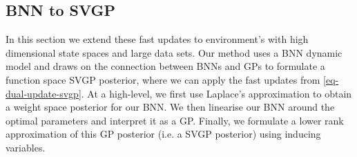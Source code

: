 \documentclass{article}
\newcommand{\state}{\ensuremath{\mathbf{s}}}
\newcommand{\action}{\ensuremath{\mathbf{a}}}
\newcommand{\inducingVariable}{\ensuremath{\mathbf{u}}}
\newcommand{\dualParam}[1]{\ensuremath{\bm{\lambda}_{#1}}}
\newcommand{\meanParam}[1]{\ensuremath{\bm{\mu}_{#1}}}
\newcommand{\horizon}{\ensuremath{h}}
\newcommand{\latentFn}{\ensuremath{f}}
\begin{document}


\subsection{BNN to SVGP}
In this section we extend these fast updates to environment's with high dimensional state spaces and large data sets.
Our method uses a BNN dynamic model and draws on the connection between BNNs and GPs
\parencite{khanApproximate2019} to formulate a function space SVGP posterior,
where we can apply the fast updates from \cref{eq-dual-update-svgp}.
At a high-level, we first use Laplace's approximation to obtain a weight space posterior for our BNN.
We then linearise our BNN around the optimal parameters and interpret it as a GP.
Finally, we formulate a lower rank approximation of this GP posterior (i.e. a SVGP posterior) using inducing variables.

\end{document}
